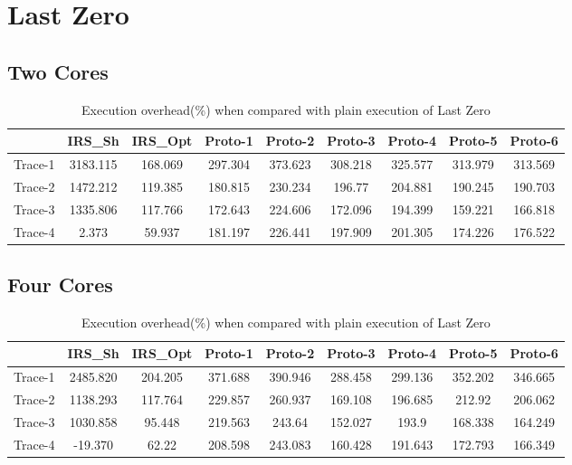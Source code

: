 \section{Last Zero}

\subsection{Two Cores}
\begin{table}[h]
\begin{center}
 \begin{tabular}{|c c c c c c c c c|} 
 \hline
 & IRS\_Sh & IRS\_Opt& Proto-1 & Proto-2 & Proto-3 & Proto-4 & Proto-5 & Proto-6\\ %
 \hline
Trace-1 & 3183.115 & 168.069 & 297.304 & 373.623 & 308.218 & 325.577 & 313.979 & 313.569\\
Trace-2 & 1472.212 & 119.385 & 180.815 & 230.234 & 196.77 & 204.881 & 190.245 & 190.703\\
Trace-3 & 1335.806 & 117.766 & 172.643 & 224.606 & 172.096 & 194.399 & 159.221 & 166.818\\
Trace-4 & 2.373 & 59.937 & 181.197 & 226.441 & 197.909 & 201.305 & 174.226 & 176.522\\
\hline
\end{tabular}
\end{center}
\caption{Execution overhead(\%) when compared with plain execution of Last Zero}
\label{last_zero_irs_res_cores_2}
\end{table}

\subsection{Four Cores}
\begin{table}[h]
\begin{center}
 \begin{tabular}{|c c c c c c c c c|} 
 \hline
 & IRS\_Sh & IRS\_Opt& Proto-1 & Proto-2 & Proto-3 & Proto-4 & Proto-5 & Proto-6\\ %
 \hline
Trace-1 & 2485.820 & 204.205 & 371.688 & 390.946 & 288.458 & 299.136 & 352.202 & 346.665\\
Trace-2 & 1138.293 & 117.764 & 229.857 & 260.937 & 169.108 & 196.685 & 212.92 & 206.062\\
Trace-3 & 1030.858 & 95.448 & 219.563 & 243.64 & 152.027 & 193.9 & 168.338 & 164.249\\
Trace-4 & -19.370 & 62.22 & 208.598 & 243.083 & 160.428 & 191.643 & 172.793 & 166.349\\
\hline
\end{tabular}
\end{center}
\caption{Execution overhead(\%) when compared with plain execution of Last Zero}
\label{last_zero_irs_res_cores_4}
\end{table}

